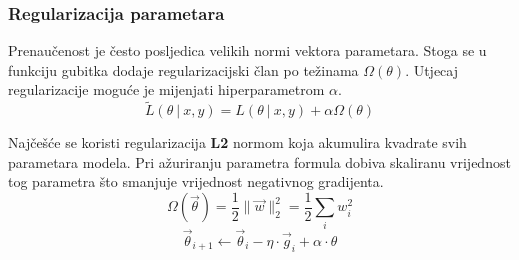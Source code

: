 \documentclass[times, utf8, numeric, diplomski]{fer}
\def\probsep{\ |\ }
\def\TODO#1{\noindent\textcolor{red}{TODO: \textit{#1}}\newline}
\def\todo#1{\TODO{#1}}
\begin{document}
\subsubsection{Regularizacija parametara}
Prenaučenost je često posljedica velikih normi vektora parametara. Stoga se u funkciju gubitka dodaje regularizacijski član po težinama $\Omega(\theta)$. Utjecaj regularizacije moguće je mijenjati hiperparametrom $\alpha$.
\begin{equation}
\label{eq:weights_regularization}
\tilde{L}(\theta \probsep x,y) = L(\theta \probsep x,y) + \alpha\Omega(\theta)
\end{equation}

Najčešće se koristi regularizacija \textbf{L2} normom koja akumulira kvadrate svih parametara modela. Pri ažuriranju parametra formula dobiva skaliranu vrijednost tog parametra što smanjuje vrijednost negativnog gradijenta.
\begin{equation}
\Omega(\vec{\theta}) = \frac{1}{2} \|\vec{w}\|_2^2 = \frac{1}{2} \sum_i w_i^2
\end{equation}
\begin{equation}
\vec{\theta}_{i+1} \gets \vec{\theta}_i - \eta \cdot \vec{g}_i + \alpha \cdot \theta
\end{equation}


%
\end{document}
